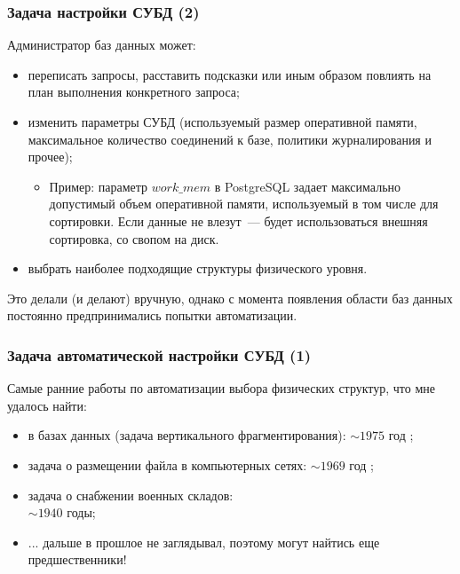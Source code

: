 \documentclass[unicode]{beamer}
\begin{document}
\begin{frame}
\frametitle{Задача настройки СУБД (2)}

Администратор баз данных может:
\begin{itemize}
  \setlength\itemsep{1em}  
  \item переписать запросы, расставить подсказки или иным образом повлиять на план выполнения \alert{конкретного} запроса;
  \item изменить параметры СУБД (используемый размер оперативной памяти, максимальное количество соединений к базе, политики журналирования и прочее);
  \begin{itemize}
  	\item Пример: параметр $work\_mem$ в PostgreSQL задает максимально допустимый объем оперативной памяти, используемый в том числе для сортировки. Если данные не влезут~--- будет использоваться внешняя сортировка, со свопом на диск.
  \end{itemize}
  \item \alert{выбрать наиболее подходящие структуры физического уровня.}
\end{itemize}


Это делали (и делают) вручную, однако с момента появления области баз данных постоянно предпринимались попытки автоматизации.

\end{frame}


\begin{frame}
\frametitle{Задача автоматической настройки СУБД (1)}

Самые ранние работы по автоматизации выбора физических структур, что мне удалось найти: 
\begin{itemize}
  \setlength\itemsep{1em}
  \item в базах данных (задача вертикального фрагментирования): $\sim 1975$ год \cite{p1};
  \item задача о размещении файла в компьютерных сетях: $\sim 1969$ год \cite{p2};
  \item задача о снабжении военных складов: \\ $\sim 1940$ годы;
  \item ... дальше в прошлое не заглядывал, поэтому могут найтись еще предшественники!
\end{itemize}

\end{frame}
\end{document}
